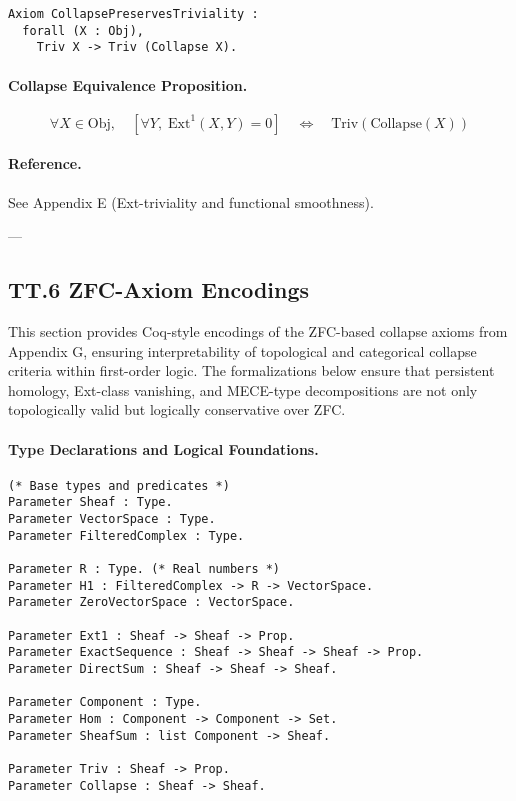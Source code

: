 \documentclass[11pt]{article}
\begin{document}
\noindent
\begin{lstlisting}[language=Coq, breaklines=true]
Axiom CollapsePreservesTriviality :
  forall (X : Obj),
    Triv X -> Triv (Collapse X).
\end{lstlisting}



\paragraph{Collapse Equivalence Proposition.}
\[
\forall X \in \mathrm{Obj},\quad
\left[ \forall Y,\; \mathrm{Ext}^1(X,Y) = 0 \right]
\quad \Leftrightarrow \quad
\mathrm{Triv}(\mathrm{Collapse}(X))
\]

\paragraph{Reference.}
See Appendix E (Ext-triviality and functional smoothness).

---

\subsection*{TT.6 ZFC-Axiom Encodings}

This section provides Coq-style encodings of the ZFC-based collapse axioms from Appendix G,  
ensuring interpretability of topological and categorical collapse criteria within first-order logic.  
The formalizations below ensure that persistent homology, Ext-class vanishing, and MECE-type decompositions  
are not only topologically valid but logically conservative over ZFC.

\paragraph{Type Declarations and Logical Foundations.}

\noindent
\begin{lstlisting}[language=Coq, breaklines=true]
(* Base types and predicates *)
Parameter Sheaf : Type.
Parameter VectorSpace : Type.
Parameter FilteredComplex : Type.

Parameter R : Type. (* Real numbers *)
Parameter H1 : FilteredComplex -> R -> VectorSpace.
Parameter ZeroVectorSpace : VectorSpace.

Parameter Ext1 : Sheaf -> Sheaf -> Prop.
Parameter ExactSequence : Sheaf -> Sheaf -> Sheaf -> Prop.
Parameter DirectSum : Sheaf -> Sheaf -> Sheaf.

Parameter Component : Type.
Parameter Hom : Component -> Component -> Set.
Parameter SheafSum : list Component -> Sheaf.

Parameter Triv : Sheaf -> Prop.
Parameter Collapse : Sheaf -> Sheaf.
\end{lstlisting}
\end{document}
